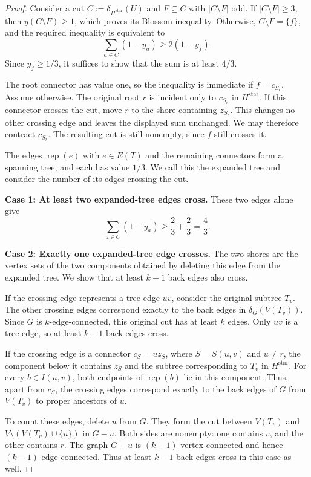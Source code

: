 \documentclass[11pt]{amsart}
\newcommand{\rep}[1]{\operatorname{rep}(#1)}
\newcommand{\1}{\mathbbm{1}}
\begin{document}
\begin{proof}
Consider a cut $C:=\delta_{H^{\mathrm{star}}}(U)$ and $F\subseteq C$ with
$|C\setminus F|$ odd. If $|C\setminus F|\ge3$, then
$y(C\setminus F)\ge1$, which proves its Blossom inequality.
Otherwise, $C\setminus F=\{f\}$, and the required inequality
is equivalent to
\[
 \sum_{a\in C}(1-y_a)\ge2(1-y_f).
\]
Since $y_f\ge1/3$, it suffices to show that the sum is at least
$4/3$.

The root connector has value one, so the inequality is immediate
if $f=c_{S_r}$. Assume otherwise. The original root $r$ is
incident only to $c_{S_r}$ in $H^{\mathrm{star}}$. If this connector crosses the
cut, move $r$ to the shore containing $z_{S_r}$. This changes no
other crossing edge and leaves the displayed sum unchanged.
We may therefore contract $c_{S_r}$. The resulting cut is still
nonempty, since $f$ still crosses it.

The edges $\rep{e}$ with $e\in E(T)$ and the remaining connectors
form a spanning tree, and each has value $1/3$. We call this the
expanded tree and consider the number of its edges crossing the cut.

\smallskip\noindent
\textbf{Case 1: At least two expanded-tree edges cross.}
These two edges alone give
\[
 \sum_{a\in C}(1-y_a)\ge\frac23+\frac23=\frac43.
\]

\smallskip\noindent
\textbf{Case 2: Exactly one expanded-tree edge crosses.}
The two shores are the vertex sets of the two components obtained
by deleting this edge from the expanded tree. We show that at
least $k-1$ back edges also cross.

If the crossing edge represents a tree edge $uv$, consider the
original subtree $T_v$. The other crossing edges correspond
exactly to the back edges in $\delta_G(V(T_v))$. Since $G$ is
$k$-edge-connected, this original cut has at least $k$ edges.
Only $uv$ is a tree edge, so at least $k-1$ back edges cross.

If the crossing edge is a connector $c_S=uz_S$, where
$S=S(u,v)$ and $u\ne r$, the component below it contains
$z_S$ and the subtree corresponding to $T_v$ in
$H^{\mathrm{star}}$. For every $b\in I(u,v)$, both endpoints
of $\rep{b}$ lie in this component. Thus, apart from $c_S$,
the crossing edges correspond exactly to the back edges
of $G$ from $V(T_v)$ to proper ancestors of $u$.

To count these edges, delete $u$ from $G$. They form the cut
between $V(T_v)$ and $V\setminus(V(T_v)\cup\{u\})$ in $G-u$.
Both sides are nonempty: one contains $v$, and the other contains
$r$. The graph $G-u$ is $(k-1)$-vertex-connected and hence
$(k-1)$-edge-connected. Thus at least $k-1$ back edges cross
in this case as well.


\end{proof}
\end{document}

